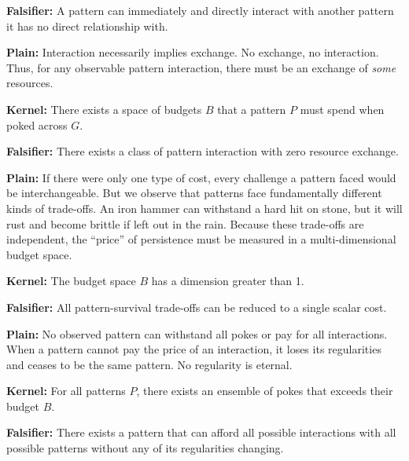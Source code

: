 \begin{description}[leftmargin=2.2cm,style=nextline]
\textbf{Falsifier:} A pattern can immediately and directly interact with another pattern it has no direct relationship with.

\item[\textbf{P4 (All pattern interactions must have a price).}]
\label{prior:P4}\label{prior:cost}\label{prior:A6}

\textbf{Plain:} Interaction necessarily implies exchange. No exchange, no interaction. Thus, for any observable pattern interaction, there must be an exchange of \emph{some} resources.

\textbf{Kernel:} There exists a space of budgets $B$ that a pattern $P$ must spend when poked across $G$.

\textbf{Falsifier:} There exists a class of pattern interaction with zero resource exchange.

\item[\textbf{P5 (There is more than one independent price).}]
\label{prior:P5}\label{prior:multidimensional-budgets}\label{prior:A8}

\textbf{Plain:} If there were only one type of cost, every challenge a pattern faced would be interchangeable. But we observe that patterns face fundamentally different kinds of trade-offs. An iron hammer can withstand a hard hit on stone, but it will rust and become brittle if left out in the rain. Because these trade-offs are independent, the ``price'' of persistence must be measured in a multi-dimensional budget space.

\textbf{Kernel:} The budget space $B$ has a dimension greater than 1.

\textbf{Falsifier:} All pattern-survival trade-offs can be reduced to a single scalar cost.

\item[\textbf{P6 (Every pattern has pokes it cannot afford to survive).}]
\label{prior:P6}\label{prior:finite-budgets}\label{prior:A7}

\textbf{Plain:} No observed pattern can withstand all pokes or pay for all interactions. When a pattern cannot pay the price of an interaction, it loses its regularities and ceases to be the same pattern. No regularity is eternal.

\textbf{Kernel:} For all patterns $P$, there exists an ensemble of pokes that exceeds their budget $B$.

\textbf{Falsifier:} There exists a pattern that can afford all possible interactions with all possible patterns without any of its regularities changing.


\end{description}
